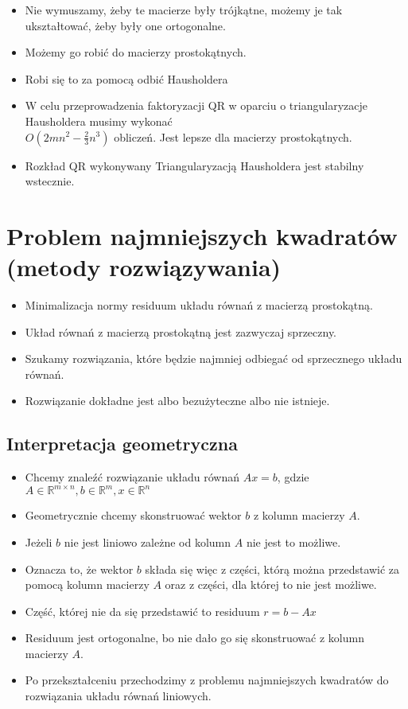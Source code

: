 \documentclass[a4paper]{article}
\begin{document}
\begin{itemize}
    \item Nie wymuszamy, żeby te macierze były trójkątne, możemy je tak ukształtować, żeby były one ortogonalne.
    \item Możemy go robić do macierzy prostokątnych.
    \item Robi się to za pomocą odbić Hausholdera
    \item W celu przeprowadzenia faktoryzacji QR w oparciu o triangularyzacje Hausholdera musimy wykonać \\ $O(2mn^2 - \frac{2}{3}n^3)$ obliczeń. Jest lepsze dla macierzy prostokątnych.
    \item Rozkład QR wykonywany Triangularyzacją Hausholdera jest stabilny wstecznie.
\end{itemize}

\section{Problem najmniejszych kwadratów (metody rozwiązywania)}
\begin{itemize}
    \item Minimalizacja normy residuum układu równań z macierzą prostokątną.
    \item Układ równań z macierzą prostokątną jest zazwyczaj sprzeczny.
    \item Szukamy rozwiązania, które będzie najmniej odbiegać od sprzecznego układu równań.
    \item Rozwiązanie dokładne jest albo bezużyteczne albo nie istnieje.
\end{itemize}

\subsection{Interpretacja geometryczna}
\begin{itemize}
    \item Chcemy znaleźć rozwiązanie układu równań $Ax=b$, gdzie $A \in \mathbb{R}^{m \times n},b\in \mathbb{R}^{m},x\in \mathbb{R}^{n}$
    \item Geometrycznie chcemy skonstruować wektor $b$ z kolumn macierzy $A$.
    \item Jeżeli $b$ nie jest liniowo zależne od kolumn $A$ nie jest to możliwe.
    \item Oznacza to, że wektor $b$ składa się więc z części, którą można przedstawić za pomocą kolumn macierzy $A$ oraz z części, dla której to nie jest możliwe.
    \item Część, której nie da się przedstawić to residuum $r = b - Ax$
    \item Residuum jest ortogonalne, bo nie dało go się skonstruować z kolumn macierzy $A$.
    \item Po przekształceniu przechodzimy z problemu najmniejszych kwadratów do rozwiązania układu równań liniowych.
\end{itemize}
\end{document}
